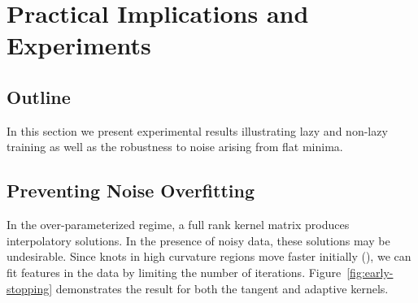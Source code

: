 \section{Practical Implications and Experiments}
\subsection{Outline}

In this section we present experimental results illustrating lazy and non-lazy training as well as the robustness to noise arising from flat minima.

\subsection{Preventing Noise Overfitting}
In the over-parameterized regime, a full rank kernel matrix produces interpolatory solutions. In the presence of noisy data, these solutions may be undesirable. Since knots in high curvature regions move faster initially (), we can fit features in the data by limiting the number of iterations. Figure~\ref{fig:early-stopping} demonstrates the result for both the tangent and adaptive kernels. 

